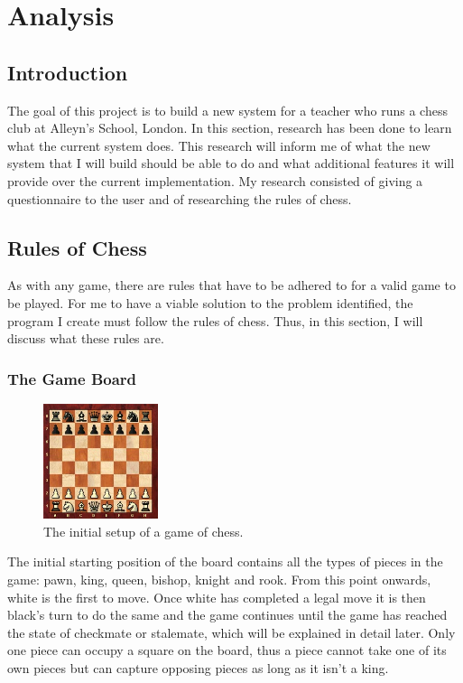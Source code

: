 \chapter{Analysis}
\section{Introduction} \label{introduction}
The goal of this project is to build a new system for a teacher who runs a chess club at Alleyn's School, London. In this section, research has been done to learn what the current system does. This research will inform me of what the new system that I will build should be able to do and what additional features it will provide over the current implementation. My research consisted of giving a questionnaire to the user and of researching the rules of chess.
\section{Rules of Chess}
As with any game, there are rules that have to be adhered to for a valid game to be played. For me to have a viable solution to the problem identified, the program I create must follow the rules of chess. Thus, in this section, I will discuss what these rules are.
\subsection{The Game Board}
\begin{figure}[H]
\centering
	\includegraphics[width=0.3\textwidth]{images/boards/initial_board}
	\caption{The initial setup of a game of chess.}
	\label{initial-board}
\end{figure}
The initial starting position of the board contains all the types of pieces in the game: pawn, king, queen, bishop, knight and rook. From this point onwards, white is the first to move. Once white has completed a legal move it is then black's turn to do the same and the game continues until the game has reached the state of checkmate or stalemate, which will be explained in detail later. Only one piece can occupy a square on the board, thus a piece cannot take one of its own pieces but can capture opposing pieces as long as it isn't a king.

